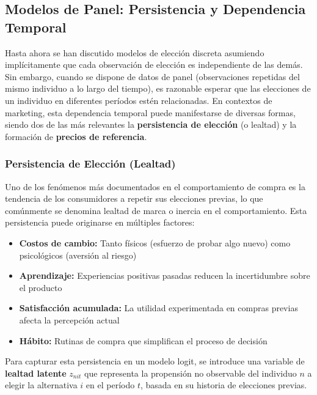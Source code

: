 \documentclass[
]{book}
\providecommand{\tightlist}{%
  \setlength{\itemsep}{0pt}\setlength{\parskip}{0pt}}
\begin{document}
\hypertarget{modelos-de-panel-persistencia-y-dependencia-temporal}{%
\subsection{Modelos de Panel: Persistencia y Dependencia Temporal}\label{modelos-de-panel-persistencia-y-dependencia-temporal}}

Hasta ahora se han discutido modelos de elección discreta asumiendo implícitamente que cada observación de elección es independiente de las demás. Sin embargo, cuando se dispone de datos de panel (observaciones repetidas del mismo individuo a lo largo del tiempo), es razonable esperar que las elecciones de un individuo en diferentes períodos estén relacionadas. En contextos de marketing, esta dependencia temporal puede manifestarse de diversas formas, siendo dos de las más relevantes la \textbf{persistencia de elección} (o lealtad) y la formación de \textbf{precios de referencia}.

\hypertarget{persistencia-de-elecciuxf3n-lealtad}{%
\subsubsection{Persistencia de Elección (Lealtad)}\label{persistencia-de-elecciuxf3n-lealtad}}

Uno de los fenómenos más documentados en el comportamiento de compra es la tendencia de los consumidores a repetir sus elecciones previas, lo que comúnmente se denomina lealtad de marca o inercia en el comportamiento. Esta persistencia puede originarse en múltiples factores:

\begin{itemize}
\tightlist
\item
  \textbf{Costos de cambio:} Tanto físicos (esfuerzo de probar algo nuevo) como psicológicos (aversión al riesgo)
\item
  \textbf{Aprendizaje:} Experiencias positivas pasadas reducen la incertidumbre sobre el producto
\item
  \textbf{Satisfacción acumulada:} La utilidad experimentada en compras previas afecta la percepción actual
\item
  \textbf{Hábito:} Rutinas de compra que simplifican el proceso de decisión
\end{itemize}

Para capturar esta persistencia en un modelo logit, se introduce una variable de \textbf{lealtad latente} \(z_{nit}\) que representa la propensión no observable del individuo \(n\) a elegir la alternativa \(i\) en el período \(t\), basada en su historia de elecciones previas.
\end{document}
